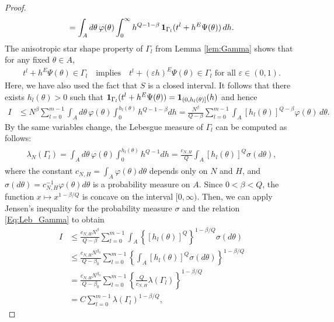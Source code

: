 \documentclass[11pt, reqno]{amsart}
\numberwithin{equation}{section}
\begin{document}
\begin{proof}
\begin{align*}
= \int_A d\theta \, \varphi(\theta) \int_0^\infty h^{Q-1-\beta} \, {\bf 1}_{\Gamma_l}(t^l+h^E\Psi(\theta))\, dh.
\end{align*}
The anisotropic star shape property of $\Gamma_l$ from Lemma \ref{lem:Gamma} shows that for any fixed $\theta \in A$, 
\begin{align*}
t^l + h^E \Psi(\theta) \in \Gamma_l \quad \text{implies} \quad t^l + (\varepsilon h)^E \Psi(\theta) \in \Gamma_l \text{ for all } 
\varepsilon \in (0, 1).
\end{align*}
Here, we have also used the fact that $S$ is a closed interval.
It follows that there exists $h_l(\theta) > 0$ such that ${\bf 1}_{\Gamma_l}(t^l+h^E\Psi(\theta)) = {\bf 1}_{(0, h_l(\theta)]}(h)$ and hence
\begin{align*}
I & \le N^\beta \sum_{l=0}^{m-1} \int_A d\theta \, \varphi(\theta) \int_0^{h_l(\theta)} h^{Q-1-\beta} dh = \frac{N^\beta}{Q-\beta} 
\sum_{l=0}^{m-1} \int_A [h_l(\theta)]^{Q-\beta} \varphi(\theta)\,d\theta.
\end{align*}
By the same variables change, the Lebesgue measure of $\Gamma_l$ can be computed as follows:
\begin{align}
\begin{aligned}\label{Eq:Leb_Gamma}
\lambda_N(\Gamma_l) 
= \int_A d\theta \, \varphi(\theta) \int_0^{h_l(\theta)} h^{Q-1} dh
= \frac{c_{N, H}}{Q} \int_A [h_l(\theta)]^Q \sigma(d\theta),
\end{aligned}
\end{align}
where the constant $c_{N, H} = \int_A \varphi(\theta) d\theta$ depends only on $N$ and $H$, and $\sigma(d\theta) = c_{N, H}^{-1}
 \varphi(\theta) d\theta$ is a probability measure on $A$.
Since $0 < \beta < Q$, the function $x \mapsto x^{1-\beta/Q}$ is concave on the interval $[0, \infty)$.
Then, we can apply Jensen's inequality for the probability measure $\sigma$ and the relation \eqref{Eq:Leb_Gamma} to obtain
\begin{align*}
I & \le \frac{c_{N, H} N^{\beta}}{Q-\beta} \sum_{l=0}^{m-1} \int_A \left\{[h_l(\theta)]^Q\right\}^{1-\beta/Q} \sigma(d\theta)\\
& \le \frac{c_{N, H} N^{\beta_0}}{Q-\beta_0}\sum_{l=0}^{m-1} \left\{\int_A [h_l(\theta)]^Q  \sigma(d\theta)\right\}^{1-\beta/Q}\\
& = \frac{c_{N, H} N^{\beta_0}}{Q-\beta_0}\sum_{l=0}^{m-1} \left\{ \frac{Q}{c_{N, H}} \lambda(\Gamma_l) \right\}^{1-\beta/Q}\\
& = C \sum_{l=0}^{m-1}  {\lambda(\Gamma_l)}^{1-\beta/Q},
\end{align*}

\end{proof}
\end{document}
